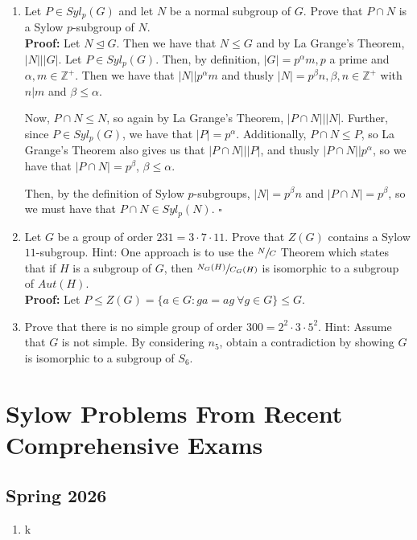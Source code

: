 \documentclass{article}
\begin{document}
\begin{enumerate}
    Lastly, we have $n_2$. Note that we must have that $n_2=1$ since $H \in Syl_2(G) \Longrightarrow |H| = 4$. Then $H \trianglelefteq G$ 
    and $G$ is not simple. $\square$

    \item Let $P \in Syl_p(G)$ and let $N$ be a normal subgroup of $G$. Prove that $P \cap N$ is a Sylow $p$-subgroup of $N$.\\
    \textbf{Proof:} Let $N \trianglelefteq G$. Then we have that $N \leq G$ and by La Grange's Theorem, $|N| \big| |G|$. Let $P \in Syl_p(G)$. 
    Then, by definition, $|G| = p^{\alpha}m, p$ a prime and $\alpha,m \in \mathbb{Z}^+$. Then we have that $|N| \big| p^{\alpha}m$ and thusly
    $|N| = p^{\beta}n, \beta,n \in \mathbb{Z}^+$ with $n \big| m$ and $\beta \leq \alpha$.

    Now, $P \cap N \leq N$, so again by La Grange's Theorem, $|P \cap N | \big| |N|$. Further, since $P \in Syl_p(G)$, we have that 
    $|P| = p^{\alpha}$. Additionally, $P \cap N \leq P$, so La Grange's Theorem also gives us that $|P \cap N| \big| |P|$, and thusly
    $|P \cap N| \big| p^{\alpha}$, so we have that $|P \cap N| = p^{\beta}$, $\beta \leq \alpha$.

    Then, by the definition of Sylow $p$-subgroups, $|N| = p^{\beta}n$ and $|P \cap N|=p^{\beta}$, so we must have that $P \cap N \in Syl_p(N)$. $\square$
    \item Let $G$ be a group of order $231 = 3 \cdot 7 \cdot 11$. Prove that $Z(G)$ contains a Sylow $11$-subgroup. Hint: One approach is 
    to use the $\sfrac{N}{C}$ Theorem which states that if $H$ is a subgroup of $G$, then $\sfrac{N_G(H)}{C_G(H)}$ is isomorphic to a 
    subgroup of $Aut(H)$.\\
    \textbf{Proof:} Let $P \leq Z(G) = \{a \in G: ga = ag \ \forall g \in G\} \leq G$.
    \item Prove that there is no simple group of order $300 = 2^2 \cdot 3 \cdot 5^2$. Hint: Assume that $G$ is not simple. By considering 
    $n_5$, obtain a contradiction by showing $G$ is isomorphic to a subgroup of $S_6$.
\end{enumerate}

\newpage

\section{Sylow Problems From Recent Comprehensive Exams}

\subsection{Spring 2026}
    \begin{enumerate}
        \item k
    \end{enumerate}
\end{document}

